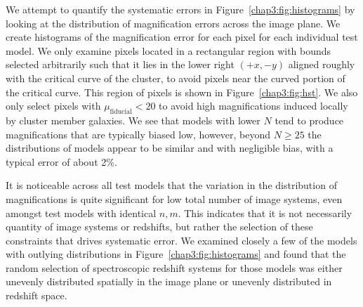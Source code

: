 We attempt to quantify the systematic errors in Figure~\ref{chap3:fig:histograms} by looking at the distribution of magnification errors across the image plane. We create histograms of the magnification error for each pixel for each individual test model. We only examine pixels located in a rectangular region with bounds selected arbitrarily such that it lies in the lower right $(+x,-y)$ aligned roughly with the critical curve of the cluster, to avoid pixels near the curved portion of the critical curve. This region of pixels is shown in Figure~\ref{chap3:fig:hst}. We also only select pixels with $\mu_\mathrm{fiducial}<20$ to avoid high magnifications induced locally by cluster member galaxies. We see that models with lower $N$ tend to produce magnifications that are typically biased low, however, beyond $N\geq25$ the distributions of models appear to be similar and with negligible bias, with a typical error of about 2\%.

It is noticeable across all test models that the variation in the distribution of magnifications is quite significant for low total number of image systems, even amongst test models with identical $n,m$. This indicates that it is not necessarily quantity of image systems or redshifts, but rather the selection of these constraints that drives systematic error. We examined closely a few of the models with outlying distributions in Figure~\ref{chap3:fig:histograms} and found that the random selection of spectroscopic redshift systems for those models was either unevenly distributed spatially in the image plane or unevenly distributed in redshift space.

